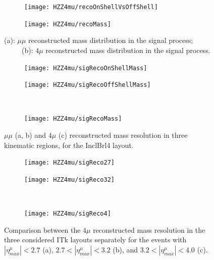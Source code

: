 \documentclass[a4paper,twoside,12pt]{book}
\begin{document}
\begin{figure}
\begin{subfigure}{.5\linewidth}
\texttt{[image: HZZ4mu/recoOnShellVsOffShell]}
\caption{}
\label{fig:HZZ4mu:recoOnShellVsOffShell}
\end{subfigure}
\begin{subfigure}{.5\linewidth}
\centering
\texttt{[image: HZZ4mu/recoMass]}
\caption{}
\label{fig:HZZ4mu:recoMass}
\end{subfigure}
\caption{(a): $\mu\mu$ reconstructed  mass distribution in the signal process;\\
\ \ \ \ \ (b): $4\mu$ reconstructed mass distribution in the signal process.}
\label{fig:HZZ4mu:recoMasses}
\end{figure}


\begin{figure}
\begin{subfigure}{.5\linewidth}
\texttt{[image: HZZ4mu/sigRecoOnShellMass]}
\caption{}
\label{fig:HZZ4mu:sigRecoOnShellMass}
\end{subfigure}
\begin{subfigure}{.5\linewidth}
\centering
\texttt{[image: HZZ4mu/sigRecoOffShellMass]}
\caption{}
\label{fig:HZZ4mu:sigRecoOffShell}
\end{subfigure}\\[1ex]
\begin{subfigure}{\linewidth}
\centering
\texttt{[image: HZZ4mu/sigRecoMass]}
\caption{}
\label{fig:HZZ4mu:sigRecoMass}
\end{subfigure}
\caption{$\mu\mu$ (a, b) and $4\mu$ (c) reconstructed  mass resolution in three kinematic regions, 
		for the InclBrl4 layout.}
\label{fig:HZZ4mu:massResolution}
\end{figure}

\begin{figure}
\begin{subfigure}{.5\linewidth}
\texttt{[image: HZZ4mu/sigReco27]}
\caption{}
\label{fig:HZZ4mu:sigReco27}
\end{subfigure}
\begin{subfigure}{.5\linewidth}
\centering
\texttt{[image: HZZ4mu/sigReco32]}
\caption{}
\label{fig:HZZ4mu:sigReco32}
\end{subfigure}\\[1ex]
\begin{subfigure}{\linewidth}
\centering
\texttt{[image: HZZ4mu/sigReco4]}
\caption{}
\label{fig:HZZ4mu:sigReco4}
\end{subfigure}
\caption{Comparison between the $4\mu$ reconstructed mass resolution in the
three considered ITk layouts separately for the events with $|\eta^\mu_{max}| < 2.7$ (a),
	$2.7 < |\eta^\mu_{max}| < 3.2$ (b), and $3.2 < |\eta^\mu_{max}| < 4.0$ (c).}
\label{fig:HZZ4mu:layoutMassResolution}
\end{figure}
\end{document}
